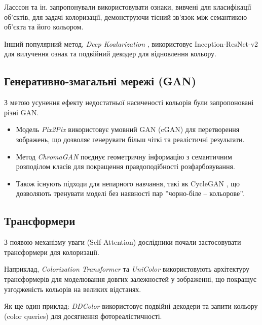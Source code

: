         Ласссон та ін. \cite{2016-learning-representations-for-automatic-colorization, 2016-colorful-image-colorization} запропонували використовувати ознаки, вивчені для класифікації об'єктів, для задачі колоризації, демонструючи тісний зв'язок між семантикою об'єкта та його кольором.

        Інший популярний метод, \textit{Deep Koalarization} \cite{2017-deep-koalarization}, використовує Inception-ResNet-v2 для вилучення ознак та подвійний декодер для відновлення кольору.

    \subsection{Генеративно-змагальні мережі (GAN)}
        З метою усунення ефекту недостатньої насиченості кольорів були запропоновані різні GAN.

        \begin{itemize}[label=$\bullet$] 
            \item Модель \textit{Pix2Pix} \cite{2017-image-to-image-translation} використовує умовний GAN (cGAN) для перетворення зображень, що дозволяє генерувати більш чіткі та реалістичні результати.
            \item Метод \textit{ChromaGAN} \cite{2020-chromagan} поєднує геометричну інформацію з семантичним розподілом класів для покращення правдоподібності розфарбовування.
            \item Також існують підходи для непарного навчання, такі як CycleGAN \cite{2017-unpaired-image-to-image-translation}, що дозволяють тренувати моделі без наявності пар ''чорно-біле -- кольорове''.
        \end{itemize}

    \subsection{Трансформери}
        З появою механізму уваги (Self-Attention) дослідники почали застосовувати трансформери для колоризації.

        Наприклад, \textit{Colorization Transformer} \cite{2021-colorization-transformer} та \textit{UniColor} \cite{2022-unicolor} використовують архітектуру трансформерів для моделювання довгих залежностей у зображенні, що покращує узгодженість кольорів на великих відстанях.

        Як ще один приклад: \textit{DDColor} \cite{2023-ddcolor} використовує подвійні декодери та запити кольору (color queries) для досягнення фотореалістичності.


